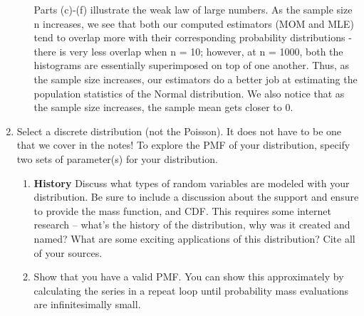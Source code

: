 \documentclass{article}\usepackage[]{graphicx}\usepackage[]{color}
\begin{document}
\begin{enumerate}
\begin{enumerate}
  Parts (c)-(f) illustrate the weak law of large numbers. As the sample size n increases, we see that both our computed estimators (MOM and MLE) tend to overlap more with their corresponding probability distributions - there is very less overlap when n = 10; however, at n = 1000, both the histograms are essentially superimposed on top of one another. Thus, as the sample size increases, our estimators do a better job at estimating the population statistics of the Normal distribution. We also notice that as the sample size increases, the sample mean gets closer to 0.
  
\end{enumerate}
\newpage
  \item\label{Q3} Select a discrete distribution (not the Poisson). It does not 
  have to be one that we cover in the notes! To explore the PMF of your distribution, 
  specify two sets of parameter(s) for your distribution.
  \begin{enumerate}
  \item \textbf{History} Discuss what types of random variables are modeled with 
  your distribution. Be sure to include a discussion about the support and ensure
  to provide the mass function, and CDF. This requires some internet research -- 
  what's the history of the distribution, why was it created and named? What are
  some exciting applications of this distribution? Cite all of your sources.
	\item Show that you have a valid PMF. You can show this approximately by 
	calculating the series in a repeat loop until probability mass evaluations are 
	infinitesimally small.

\end{enumerate}
\end{enumerate}
\end{document}

